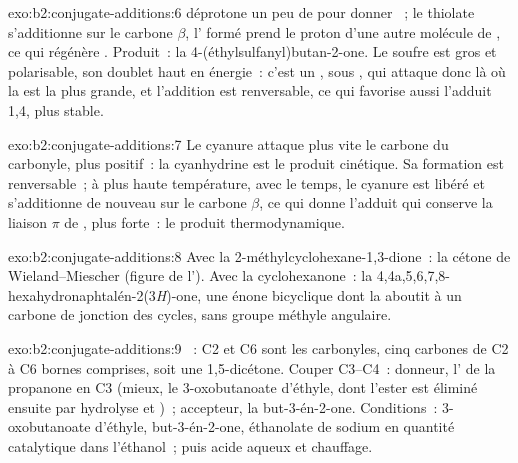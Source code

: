 \begin{solution}{exo:b2:conjugate-additions:6}
 déprotone un peu de  pour donner ~; le thiolate s'additionne sur le carbone
$\beta$, l' formé prend le proton d'une autre molécule de , ce qui régénère .
Produit~: la 4-(éthylsulfanyl)butan-2-one. Le soufre est gros et polarisable, son doublet haut en
énergie~: c'est un , sous , qui attaque donc là où la  est la plus
grande, et l'addition est renversable, ce qui favorise aussi l'adduit 1,4, plus stable.
\end{solution}

\begin{solution}{exo:b2:conjugate-additions:7}
Le cyanure attaque plus vite le carbone du carbonyle, plus positif~: la cyanhydrine est le produit
cinétique. Sa formation est renversable~; à plus haute température, avec le temps, le cyanure est libéré
et s'additionne de nouveau sur le carbone $\beta$, ce qui donne l'adduit qui conserve la liaison $\pi$ de
, plus forte~: le produit thermodynamique.
\end{solution}

\begin{solution}{exo:b2:conjugate-additions:8}
Avec la 2-méthylcyclohexane-1,3-dione~: la cétone de Wieland--Miescher (figure de l'). Avec la cyclohexanone~: la 4,4a,5,6,7,8-hexahydronaphtalén-2(3\textit{H})-one, une énone
bicyclique dont la  aboutit à un carbone de jonction des cycles, sans groupe méthyle angulaire.
\end{solution}

\begin{solution}{exo:b2:conjugate-additions:9}
~: C2 et C6 sont les carbonyles, cinq carbones de C2 à C6 bornes comprises,
soit une 1,5-dicétone. Couper C3--C4~: donneur, l' de la propanone en C3 (mieux, le 3-oxobutanoate
d'éthyle, dont l'ester est éliminé ensuite par hydrolyse et )~; accepteur, la
but-3-én-2-one. Conditions~: 3-oxobutanoate d'éthyle, but-3-én-2-one, éthanolate de sodium en quantité
catalytique dans l'éthanol~; puis acide aqueux et chauffage.
\end{solution}

